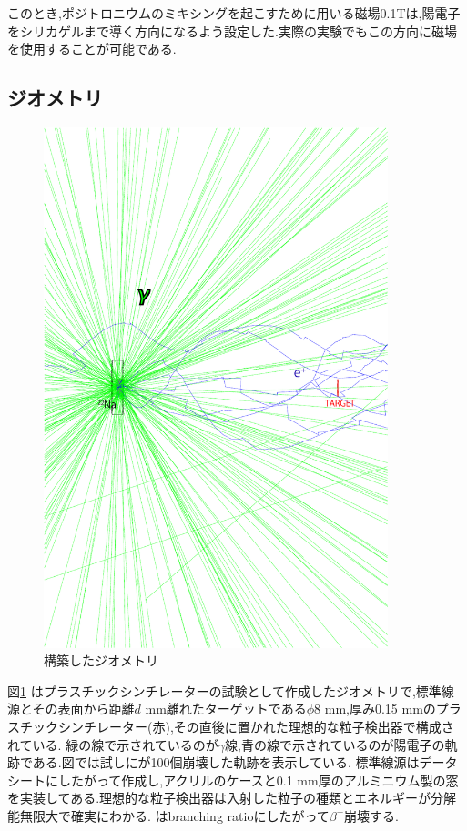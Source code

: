 このとき,ポジトロニウムのミキシングを起こすために用いる磁場0.1Tは,陽電子をシリカゲルまで導く方向になるよう設定した.実際の実験でもこの方向に磁場を使用することが可能である.

\subsection{ジオメトリ}

\begin{figure}[htbp]
	\centering
		\includegraphics[width=10cm]{img/test1_geometry.pdf}
	\caption{構築したジオメトリ}
	\label{test1_geometry}
\end{figure}

図\ref{test1_geometry} はプラスチックシンチレーターの試験として作成したジオメトリで,標準線源とその表面から距離$d$ mm離れたターゲットである$\phi8$ mm,厚み0.15 mmのプラスチックシンチレーター(赤),その直後に置かれた理想的な粒子検出器で構成されている.
緑の線で示されているのが$\gamma$線,青の線で示されているのが陽電子の軌跡である.図では試しにが100個崩壊した軌跡を表示している.
標準線源はデータシートにしたがって作成し,アクリルのケースと0.1 mm厚のアルミニウム製の窓を実装してある.理想的な粒子検出器は入射した粒子の種類とエネルギーが分解能無限大で確実にわかる.
はbranching ratioにしたがって$\beta^+$崩壊する.

